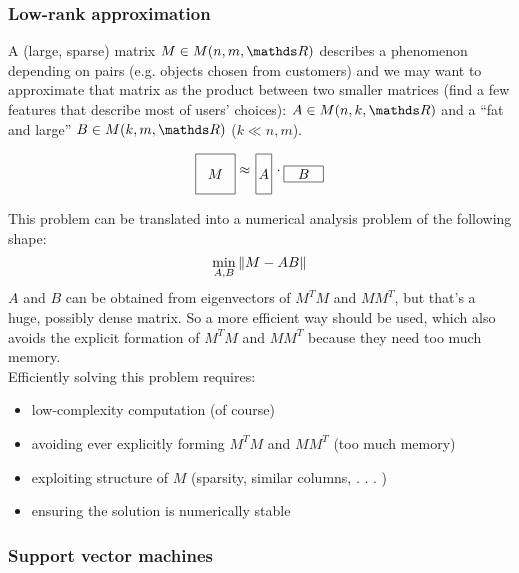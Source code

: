 \documentclass[ComputationalMathematics.tex]{subfiles}
\begin{document}
\subsubsection{Low-rank approximation}
A (large, sparse) matrix $M \in M(n, m, \R)$ describes a phenomenon depending
on pairs (e.g. objects chosen from customers) and we may want to approximate that matrix as the product between two smaller matrices (find a few features that describe most of users' choices): $A\in M(n, k, \R)$ and a ``fat and large'' $B\in M(k, m, \R)$ ($k\ll n, m$).

\[
  \begin{tikzpicture}[baseline=(current bounding box.center)]
    \draw (0,0) rectangle (1,1);
    \node at (0.5,0.5) {$M$};
  \end{tikzpicture}
  \approx
  \begin{tikzpicture}[baseline=(current bounding box.center)]
    \draw (0,0) rectangle (0.4,1);
    \node at (0.2,0.5) {$A$};
  \end{tikzpicture}
  \cdot
  \begin{tikzpicture}[baseline=(current bounding box.center)]
    \draw (0,0) rectangle (1,0.4);
    \node at (0.5,0.2) {$B$};
  \end{tikzpicture}
\]

This problem can be translated into a numerical analysis problem of the following shape:
\[
  \min_{A, B} \left\lVert M - AB\right\rVert
\]
$A$ and $B$ can be obtained from eigenvectors of $M^TM$ and $MM^T$, but that's a huge, possibly dense matrix. So a more efficient way should be used, which also avoids the explicit formation of $M^TM$ and $MM^T$ because they need too much memory.\\

\noindent Efficiently solving this problem requires:
\begin{itemize}
    \item low-complexity computation (of course)
    \item avoiding ever explicitly forming $M^T M$ and $MM^T$ (too much memory)
    \item exploiting structure of $M$ (sparsity, similar columns, . . . )
    \item ensuring the solution is numerically stable
\end{itemize}

\subsubsection{Support vector machines}
\end{document}
